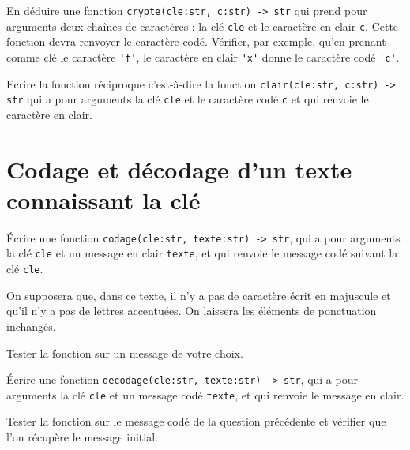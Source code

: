 \begin{question}
En déduire une fonction \lstinline{crypte(cle:str, c:str) -> str} qui prend pour arguments deux chaînes de caractères : la clé \lstinline{cle} et le caractère en clair \lstinline{c}. Cette fonction devra renvoyer le caractère codé. Vérifier, par exemple, qu'en prenant comme clé le caractère \lstinline{'f'}, le caractère en clair \lstinline{'x'} donne le caractère codé \lstinline{'c'}.
\end{question}

\begin{question}
Ecrire la fonction réciproque c'est-à-dire la fonction \lstinline{clair(cle:str, c:str) -> str} qui a pour arguments la clé \lstinline{cle} et le caractère codé \lstinline{c} et qui renvoie le caractère en clair.
\end{question}

\section*{Codage et décodage d'un texte connaissant la clé}

\begin{question}
\'Ecrire une fonction \lstinline{codage(cle:str, texte:str) -> str}, qui a pour arguments la clé \lstinline{cle} et un message en clair \lstinline{texte}, et qui renvoie le message codé suivant la clé \lstinline{cle}. 
\end{question}

On supposera que, dans ce texte, il n'y a pas de caractère écrit en majuscule et qu'il n'y a pas de lettres accentuées. On laissera les éléments de ponctuation inchangés.

\begin{question}
Tester la fonction sur un message de votre choix.
\end{question}

\begin{question}
\'Ecrire une fonction \lstinline{decodage(cle:str, texte:str) -> str}, qui a pour arguments la clé \lstinline{cle} et un message codé \lstinline{texte}, et qui renvoie le message en clair.
\end{question}

\begin{question}
Tester la fonction sur le message codé de la question précédente et vérifier que l'on récupère le message initial.
\end{question}

